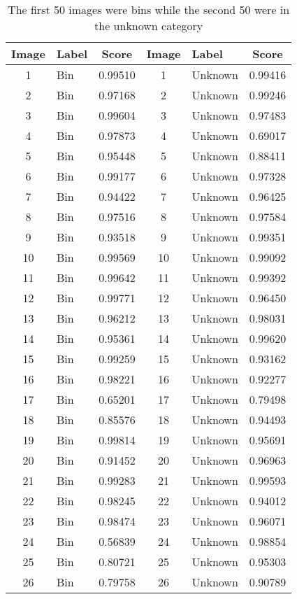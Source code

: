 \begin{table}[H]
\caption[Classifier Results]{The first 50 images were bins while the second 50 were in the unknown category}
\label{tab:classifier_results}
\centering
\begin{tabular}{c l c | c l c}
\toprule
\textbf{Image} & \textbf{Label} & \textbf{Score} & \textbf{Image} & \textbf{Label} & \textbf{Score} \\
\midrule
1 & Bin & 0.99510 & 1 & Unknown & 0.99416 \\
2 & Bin & 0.97168 & 2 & Unknown & 0.99246 \\
3 & Bin & 0.99604 & 3 & Unknown & 0.97483 \\
4 & Bin & 0.97873 & 4 & Unknown & 0.69017 \\
5 & Bin & 0.95448 & 5 & Unknown & 0.88411 \\
6 & Bin & 0.99177 & 6 & Unknown & 0.97328 \\
7 & Bin & 0.94422 & 7 & Unknown & 0.96425 \\
8 & Bin & 0.97516 & 8 & Unknown & 0.97584 \\
9 & Bin & 0.93518 & 9 & Unknown & 0.99351 \\
10 & Bin & 0.99569 & 10 & Unknown & 0.99092 \\
11 & Bin & 0.99642 & 11 & Unknown & 0.99392 \\
12 & Bin & 0.99771 & 12 & Unknown & 0.96450 \\
13 & Bin & 0.96212 & 13 & Unknown & 0.98031 \\
14 & Bin & 0.95361 & 14 & Unknown & 0.99620 \\
15 & Bin & 0.99259 & 15 & Unknown & 0.93162 \\
16 & Bin & 0.98221 & 16 & Unknown & 0.92277 \\
17 & Bin & 0.65201 & 17 & Unknown & 0.79498 \\
18 & Bin & 0.85576 & 18 & Unknown & 0.94493 \\
19 & Bin & 0.99814 & 19 & Unknown & 0.95691 \\
20 & Bin & 0.91452 & 20 & Unknown & 0.96963 \\
21 & Bin & 0.99283 & 21 & Unknown & 0.99593 \\
22 & Bin & 0.98245 & 22 & Unknown & 0.94012 \\
23 & Bin & 0.98474 & 23 & Unknown & 0.96071 \\
24 & Bin & 0.56839 & 24 & Unknown & 0.98854 \\
25 & Bin & 0.80721 & 25 & Unknown & 0.95303 \\
26 & Bin & 0.79758 & 26 & Unknown & 0.90789 \\

\end{tabular}
\end{table}
